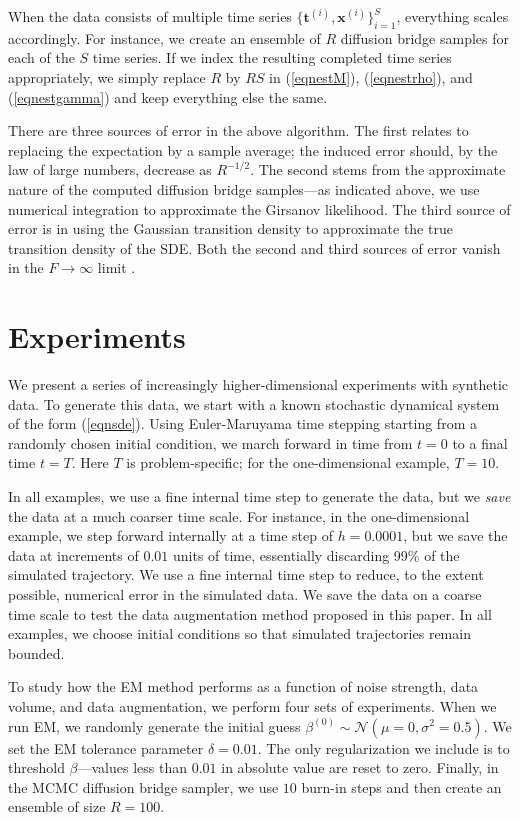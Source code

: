 \documentclass{article}
\newcommand{\bx}{\ensuremath{\mathbf{x}}}
\newcommand{\bt}{\ensuremath{\mathbf{t}}}
\begin{document}
When the data consists of multiple time series $\{ \bt^{(i)}, \bx^{(i)} \}_{i=1}^S$, everything scales accordingly.  For instance, we create an ensemble of $R$ diffusion bridge samples for each of the $S$ time series.  If we index the resulting completed time series appropriately, we simply replace $R$ by $RS$ in (\ref{eqnestM}), (\ref{eqnestrho}), and (\ref{eqnestgamma}) and keep everything else the same.

There are three sources of error in the above algorithm.  The first relates to replacing the expectation by a sample average; the induced error should, by the law of large numbers, decrease as $R^{-1/2}$.  The second stems from the approximate nature of the computed diffusion bridge samples---as indicated above, we use numerical integration to approximate the Girsanov likelihood.  The third source of error is in using the Gaussian transition density to approximate the true transition density of the SDE.  Both the second and third sources of error vanish in the $F \to \infty$ limit \cite{kloeden_numerical_2011}.

\section{Experiments}
We present a series of increasingly higher-dimensional experiments with synthetic data.  To generate this data, we start with a known stochastic dynamical system of the form (\ref{eqnsde}).  Using Euler-Maruyama time stepping starting from a randomly chosen initial condition, we march forward in time from $t=0$ to a final time $t=T$.  Here $T$ is problem-specific; for the one-dimensional example, $T=10$.

In all examples, we use a fine internal time step to generate the data, but we \emph{save} the data at a much coarser time scale.  For instance, in the one-dimensional example, we step forward internally at a time step of $h = 0.0001$, but we save the data at increments of $0.01$ units of time, essentially discarding 99\% of the simulated trajectory.  We use a fine internal time step to reduce, to the extent possible, numerical error in the simulated data.  We save the data on a coarse time scale to test the data augmentation method proposed in this paper.  In all examples, we choose initial conditions so that simulated trajectories remain bounded.

To study how the EM method performs as a function of noise strength, data volume, and data augmentation, we perform four sets of experiments.  When we run EM, we randomly generate the initial guess $\beta^{(0)} \sim \mathcal{N}(\mu=0, \sigma^2=0.5)$.  We set the EM tolerance parameter $\delta = 0.01$.  The only regularization we include is to threshold $\beta$---values less than $0.01$ in absolute value are reset to zero.  Finally, in the MCMC diffusion bridge sampler, we use $10$ burn-in steps and then create an ensemble of size $R=100$.
\end{document}

